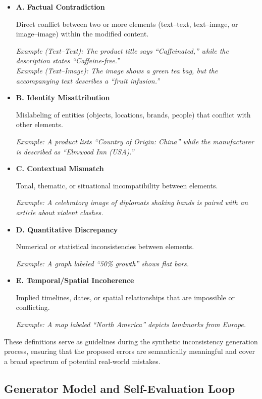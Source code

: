 \begin{itemize}
    \item \textbf{A. Factual Contradiction} 
    
    Direct conflict between two or more elements (text–text, text–image, or image–image) within the modified content.
    
    \emph{Example (Text–Text): The product title says “Caffeinated,” while the description states “Caffeine-free.”\\Example (Text–Image): The image shows a green tea bag, but the accompanying text describes a “fruit infusion.”}

    \item \textbf{B. Identity Misattribution} 
    
    Mislabeling of entities (objects, locations, brands, people) that conflict with other elements.
    
    \emph{Example: A product lists “Country of Origin: China” while the manufacturer is described as “Elmwood Inn (USA).”}

    \item \textbf{C. Contextual Mismatch} 
    
    Tonal, thematic, or situational incompatibility between elements.
    
    \emph{Example: A celebratory image of diplomats shaking hands is paired with an article about violent clashes.}

    \item \textbf{D. Quantitative Discrepancy} 
    
    Numerical or statistical inconsistencies between elements.
    
    \emph{Example: A graph labeled “50\% growth” shows flat bars.}

    \item \textbf{E. Temporal/Spatial Incoherence} 
    
    Implied timelines, dates, or spatial relationships that are impossible or conflicting.
    
    \emph{Example: A map labeled “North America” depicts landmarks from Europe.}
\end{itemize}

These definitions serve as guidelines during the synthetic inconsistency generation process, ensuring that the proposed errors are semantically meaningful and cover a broad spectrum of potential real-world mistakes.

\subsection{Generator Model and Self-Evaluation Loop}
\label{appendix:sec:generator}

